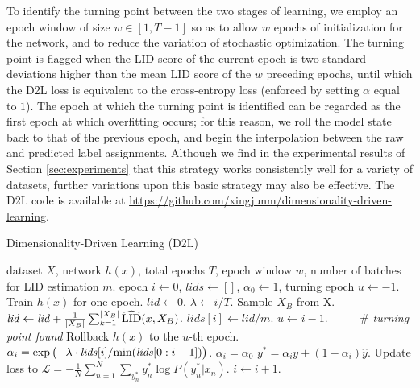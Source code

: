 \documentclass{article}
\begin{document}
To identify the turning point between the two stages of learning, we employ an epoch window of size $w \in [1, T-1]$ so as to allow $w$ epochs of initialization for the network, and to reduce the variation of stochastic optimization. The turning point is flagged when the LID score of the current epoch is two standard deviations higher than the mean LID score of the $w$ preceding epochs, until which the D2L loss is equivalent to the cross-entropy loss (enforced by setting $\alpha$ equal to $1$). The epoch at which the turning point is identified can be regarded as the first epoch at which overfitting occurs; for this reason, we roll the model state back to that of the previous epoch, and begin the interpolation between the raw and predicted label assignments. 
Although we find in the experimental results of Section \ref{sec:experiments} that this strategy works consistently well for a variety of datasets, further variations upon this basic strategy may also be effective. The D2L code is available at \url{https://github.com/xingjunm/dimensionality-driven-learning}.

\begin{algorithm}[tb]
   \caption{Dimensionality-Driven Learning (D2L)}
   \label{alg:manifold}
\begin{algorithmic}
    dataset $X$, network $h(x)$, total epochs $T$, epoch window $w$, number of batches for LID estimation  $m$.
   epoch $i\leftarrow 0$, $\mathit{lids} \leftarrow []$, $\alpha_0 \leftarrow 1$, turning epoch $u \leftarrow {-1}$.
  \REPEAT
   \STATE Train $h(x)$ for one epoch.
   \STATE $\mathit{lid} \leftarrow 0$, $\lambda \leftarrow i/T$.
   \STATE Sample $X_B$ from X.
   \STATE $\mathit{lid} \leftarrow \mathit{lid} + \frac{1}{|X_B|}\sum_{k=1}^{|X_B|}\widehat{\textup{LID}}(x, X_B)$.
   \ENDFOR
   \STATE $\mathit{lids[i]} \leftarrow \mathit{lid} / m$.
   \STATE $u \leftarrow i - 1$. ~~~~~\# \textit{turning point found}
   \STATE Rollback $h(x)$ to the $u$-th epoch.
   \ENDIF
   \STATE $\alpha_i = \exp \big({-\lambda}\cdot\mathit{lids}[i] / \textup{min}(\mathit{lids}[0:i-1])\big)$.
   \ELSE
   \STATE $\alpha_i = \alpha_0$
  \ENDIF
   \STATE  $y^{*} = \alpha_i y + (1 - \alpha_i) \widehat y$.
   \STATE Update loss to $\mathcal{L} = - \frac{1}{N}\sum_{n = 1}^{N} \sum_{y_n^*} y_n^*\log P(y_n^*|x_n)$.
   \STATE $i \leftarrow i+1$.
\end{algorithmic}
\end{algorithm}
\end{document}
